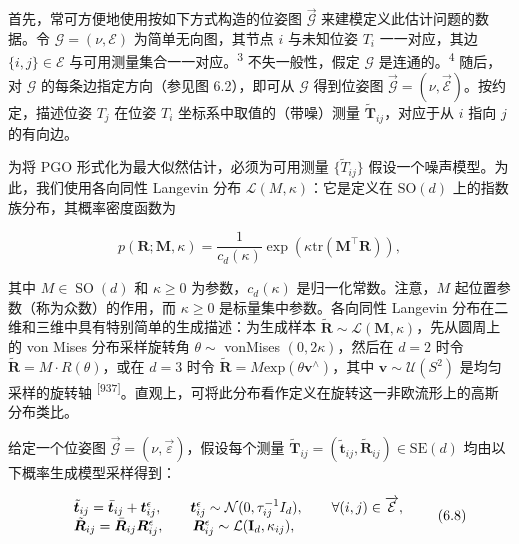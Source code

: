 首先，常可方便地使用按如下方式构造的位姿图 $\overrightarrow { \mathcal { G } }$ 来建模定义此估计问题的数据。令 $\mathcal { G } = ( \nu , \mathcal { E } )$ 为简单无向图，其节点 $i$ 与未知位姿 $T_i$ 一一对应，其边 $\{ i , j \} \in { \mathcal { E } }$ 与可用测量集合一一对应。\textsuperscript{3} 不失一般性，假定 $\mathcal { G }$ 是连通的。\textsuperscript{4} 随后，对 $\mathcal { G }$ 的每条边指定方向（参见图 6.2），即可从 $\mathcal { G }$ 得到位姿图 $\vec { \mathcal { G } } = ( \nu , \vec { \mathcal { E } } )$。按约定，描述位姿 $T_j$ 在位姿 $T_i$ 坐标系中取值的（带噪）测量 $\tilde { \pmb { T } } _ { i j }$，对应于从 $i$ 指向 $j$ 的有向边。

为将 PGO 形式化为最大似然估计，必须为可用测量 $\{ \tilde { T } _ { i j } \}$ 假设一个噪声模型。为此，我们使用各向同性 Langevin 分布 $\mathcal { L } ( M , \kappa )$：它是定义在 $\mathrm { S O } ( d )$ 上的指数族分布，其概率密度函数为

\begin{equation}
p (\boldsymbol {R}; \boldsymbol {M}, \kappa) = \frac {1}{c _ {d} (\kappa)} \exp \left(\kappa \mathrm{tr} \left(\boldsymbol {M} ^ {\top} \boldsymbol {R}\right)\right),\tag{6.7}
\end{equation}

其中 $M \in \operatorname { S O } ( d )$ 和 $\kappa \geq 0$ 为参数，$c _ { d } ( \kappa )$ 是归一化常数。注意，$M$ 起位置参数（称为众数）的作用，而 $\kappa \geq 0$ 是标量集中参数。各向同性 Langevin 分布在二维和三维中具有特别简单的生成描述：为生成样本 $\tilde { \pmb { R } } \sim \mathcal { L } ( \pmb { M } , \kappa )$，先从圆周上的 von Mises 分布采样旋转角 $\theta \sim$ vonMises $( 0 , 2 \kappa )$，然后在 $d = 2$ 时令 $\tilde { \mathbf { R } } = M \cdot R ( \theta )$，或在 $d = 3$ 时令 $\tilde { \pmb { R } } = M \mathrm { e x p } ( \theta \pmb { v } ^ { \wedge } )$，其中 $\pmb { v } \sim \mathcal { U } ( S ^ { 2 } )$ 是均匀采样的旋转轴 \textsuperscript{[937]}。直观上，可将此分布看作定义在旋转这一非欧流形上的高斯分布类比。

给定一个位姿图 $\vec { \mathcal { G } } = ( \nu , \vec { \varepsilon } )$，假设每个测量 $\tilde { \pmb { T } } _ { i j } = ( \tilde { \pmb { t } } _ { i j } , \tilde { \pmb { R } } _ { i j } ) \in \mathrm { S E } ( d )$ 均由以下概率生成模型采样得到：

\begin{equation}
\begin{array}{r l r} & {\tilde {\pmb {t}} _ {i j} = \bar {\pmb {t}} _ {i j} + \pmb {t} _ {i j} ^ {\epsilon}, \qquad \pmb {t} _ {i j} ^ {\epsilon} \sim \mathcal {N} (0, \tau_ {i j} ^ {- 1} I _ {d}), \qquad \forall (i, j) \in \overrightarrow {\mathcal {E}},} \\ & {\tilde {\pmb {R}} _ {i j} = \bar {\pmb {R}} _ {i j} \pmb {R} _ {i j} ^ {\epsilon}, \qquad \pmb {R} _ {i j} ^ {\epsilon} \sim \mathcal {L} (\mathbf {I} _ {d}, \kappa_ {i j}),} \end{array}\tag{6.8}
\end{equation}

